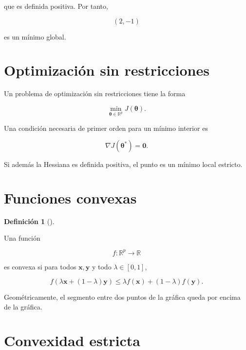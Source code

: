 \documentclass[
  spanish,
  10.5pt,
  letterpaper,
  DIV=11,
  numbers=noendperiod,
  oneside,
  open=any]{scrreprt}
\theoremstyle{definition}
\newtheorem{definition}{Definición}[chapter]
\theoremstyle{definition}
\theoremstyle{plain}
\theoremstyle{remark}
\begin{document}
que es definida positiva. Por tanto,

\[
(2,-1)
\]

es un mínimo global.

\section*{Optimización sin
restricciones}\label{optimizaciuxf3n-sin-restricciones}


Un problema de optimización sin restricciones tiene la forma

\[
\min_{\boldsymbol{\theta}\in\mathbb{R}^{p}}
J(\boldsymbol{\theta}).
\]

Una condición necesaria de primer orden para un mínimo interior es

\[
\nabla J(\boldsymbol{\theta}^{*})=\mathbf{0}.
\]

Si además la Hessiana es definida positiva, el punto es un mínimo local
estricto.

\section*{Funciones convexas}\label{funciones-convexas}


\begin{definition}[]\protect\hypertarget{def-convexidad}{}\label{def-convexidad}

Una función

\[
f:\mathbb{R}^{p}\to\mathbb{R}
\]

es convexa si para todos \(\mathbf{x},\mathbf{y}\) y todo
\(\lambda\in[0,1]\),

\[
f(
\lambda\mathbf{x}
+
(1-\lambda)\mathbf{y}
)
\leq
\lambda f(\mathbf{x})
+
(1-\lambda)f(\mathbf{y}).
\]

\end{definition}

Geométricamente, el segmento entre dos puntos de la gráfica queda por
encima de la gráfica.

\section*{Convexidad estricta}\label{convexidad-estricta}
\end{document}
